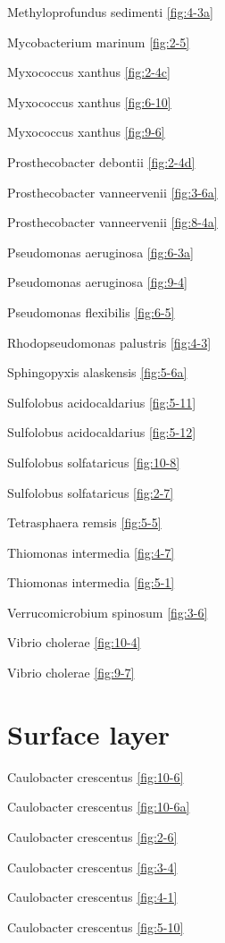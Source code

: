 \documentclass[]{tufte-book}
\begin{document}
Methyloprofundus sedimenti \ref{fig:4-3a}

Mycobacterium marinum \ref{fig:2-5}

Myxococcus xanthus \ref{fig:2-4c}

Myxococcus xanthus \ref{fig:6-10}

Myxococcus xanthus \ref{fig:9-6}

Prosthecobacter debontii \ref{fig:2-4d}

Prosthecobacter vanneervenii \ref{fig:3-6a}

Prosthecobacter vanneervenii \ref{fig:8-4a}

Pseudomonas aeruginosa \ref{fig:6-3a}

Pseudomonas aeruginosa \ref{fig:9-4}

Pseudomonas flexibilis \ref{fig:6-5}

Rhodopseudomonas palustris \ref{fig:4-3}

Sphingopyxis alaskensis \ref{fig:5-6a}

Sulfolobus acidocaldarius \ref{fig:5-11}

Sulfolobus acidocaldarius \ref{fig:5-12}

Sulfolobus solfataricus \ref{fig:10-8}

Sulfolobus solfataricus \ref{fig:2-7}

Tetrasphaera remsis \ref{fig:5-5}

Thiomonas intermedia \ref{fig:4-7}

Thiomonas intermedia \ref{fig:5-1}

Verrucomicrobium spinosum \ref{fig:3-6}

Vibrio cholerae \ref{fig:10-4}

Vibrio cholerae \ref{fig:9-7}

\hypertarget{surface-layer-1}{%
\section*{Surface layer}\label{surface-layer-1}}

Caulobacter crescentus \ref{fig:10-6}

Caulobacter crescentus \ref{fig:10-6a}

Caulobacter crescentus \ref{fig:2-6}

Caulobacter crescentus \ref{fig:3-4}

Caulobacter crescentus \ref{fig:4-1}

Caulobacter crescentus \ref{fig:5-10}
\end{document}
